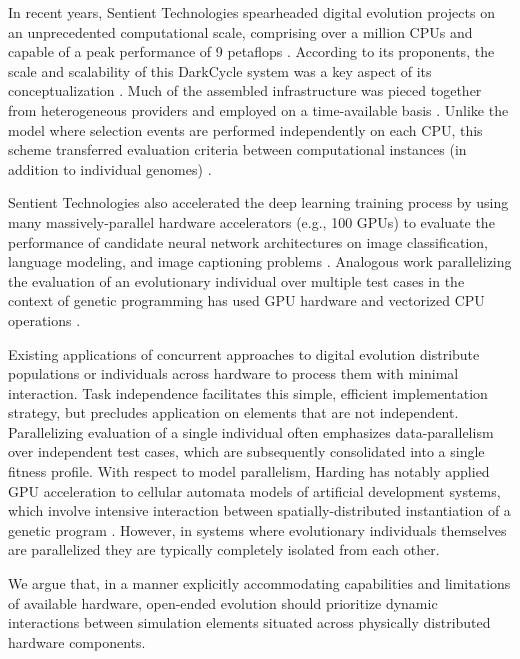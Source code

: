 In recent years, Sentient Technologies spearheaded digital evolution projects on an unprecedented computational scale, comprising over a million CPUs and capable of a peak performance of 9 petaflops \cite{miikkulainen2019evolving}.
According to its proponents, the scale and scalability of this DarkCycle system was a key aspect of its conceptualization \cite{gilbert2015artificial}.
Much of the assembled infrastructure was pieced together from heterogeneous providers and employed on a time-available basis \cite{blondeau2009distributed}.
Unlike the  model where selection events are performed independently on each CPU, this scheme transferred evaluation criteria between computational instances (in addition to individual genomes) \cite{hodjat2013distributed}.

Sentient Technologies also accelerated the deep learning training process by using many massively-parallel hardware accelerators (e.g., 100 GPUs) to evaluate the performance of candidate neural network architectures on image classification, language modeling, and image captioning problems \cite{miikkulainen2019evolving}.
Analogous work parallelizing the evaluation of an evolutionary individual over multiple test cases in the context of genetic programming has used GPU hardware and vectorized CPU operations
\cite{harding2007fast, langdon2019continuous}.

Existing applications of concurrent approaches to digital evolution distribute populations or individuals across hardware to process them with minimal interaction.
Task independence facilitates this simple, efficient implementation strategy, but precludes application on elements that are not independent.
Parallelizing evaluation of a single individual often emphasizes data-parallelism over independent test cases, which are subsequently consolidated into a single fitness profile.
With respect to model parallelism, Harding has notably applied GPU acceleration to cellular automata models of artificial development systems, which involve intensive interaction between spatially-distributed instantiation of a genetic program \cite{harding2007fast}.
However, in systems where evolutionary individuals themselves are parallelized they are typically completely isolated from each other.

We argue that, in a manner explicitly accommodating capabilities and limitations of available hardware, open-ended evolution should prioritize dynamic interactions between simulation elements situated across physically distributed hardware components.

